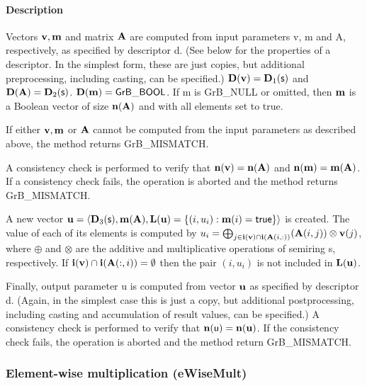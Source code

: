\documentclass[11pt]{extarticle}
\begin{document}
\paragraph{Description}

Vectors ${\bf v}, {\bf m}$ and matrix ${\bf A}$ are computed from
input parameters {\sf v}, {\sf m} and {\sf A}, respectively, as specified
by descriptor {\sf d}. (See below for the properties of a descriptor. In
the simplest form, these are just copies, but additional preprocessing,
including casting, can be specified.)  $\bold{D}({\bf v}) =
\bold{D}_1({\sf s})$ and $\bold{D}({\bf A}) = \bold{D}_2({\sf s})$.
$\bold{D}({\bf m}) = {\sf GrB\_BOOL}$.  If {\sf m} is {\sf GrB\_NULL} or omitted,
then ${\bf m}$ is a Boolean vector of size $\bold{n}({\bf A})$
and with all elements set to {\sf true}.

If either ${\bf v}, {\bf m}$ or ${\bf A}$ cannot be computed
from the input parameters as described above, the method returns {\sf
GrB\_MISMATCH}.

A consistency check is performed to verify that $\bold{n}({\bf v})
= \bold{n}({\bf A})$ and $\bold{n}({\bf m}) =
\bold{m}({\bf A})$. If a consistency check fails, the operation is
aborted and the method returns {\sf GrB\_MISMATCH}.

A new vector ${\bf u} = \langle \bold{D}_3({\sf s}),
\bold{m}({\bf A}), \bold{L}({\bf u}) = \{(i,u_i) : {\bf m}(i)
= {\sf true} \} \rangle$ is created.  The value of each of its elements
is computed by $u_i = \bigoplus_{j \in {\bf i}({\bf v}) \cap
{\bf i}({\bf A}(i,:))} ({\bf A}(i,j)) \otimes {\bf v}(j)$,
where $\oplus$ and $\otimes$ are the additive and multiplicative
operations of semiring {\sf s}, respectively.  If ${\bf i}({\bf v})
\cap {\bf i}({\bf A}(:,i)) = \emptyset$ then the pair $(i,u_i)$
is not included in $\bold{L}({\bf u})$.

Finally, output parameter {\sf u} is computed from vector ${\bf u}$
as specified by descriptor {\sf d}. (Again, in the simplest case this
is just a copy, but additional postprocessing, including casting and
accumulation of result values, can be specified.)  A consistency check is
performed to verify that $\bold{n}({\sf u}) = \bold{n}({\bf u})$. If
the consistency check fails, the operation is aborted and the method
return {\sf GrB\_MISMATCH}.


\subsubsection{Element-wise multiplication ({\sf eWiseMult})}
\end{document}
